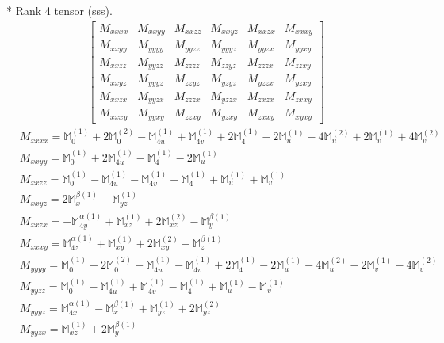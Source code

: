 \documentclass[fleqn,8pt,landscape]{jsarticle}
\begin{document}
* Rank 4 tensor (sss).
\begin{align*}
\begin{bmatrix} M_{xxxx} & M_{xxyy} & M_{xxzz} & M_{xxyz} & M_{xxzx} & M_{xxxy} \\ M_{xxyy} & M_{yyyy} & M_{yyzz} & M_{yyyz} & M_{yyzx} & M_{yyxy} \\ M_{xxzz} & M_{yyzz} & M_{zzzz} & M_{zzyz} & M_{zzzx} & M_{zzxy} \\ M_{xxyz} & M_{yyyz} & M_{zzyz} & M_{yzyz} & M_{yzzx} & M_{yzxy} \\ M_{xxzx} & M_{yyzx} & M_{zzzx} & M_{yzzx} & M_{zxzx} & M_{zxxy} \\ M_{xxxy} & M_{yyxy} & M_{zzxy} & M_{yzxy} & M_{zxxy} & M_{xyxy} \end{bmatrix}
\end{align*}
\begin{align*}
& M_{xxxx} = \mathbb{M}_{0}^{(1)} + 2 \mathbb{M}_{0}^{(2)} - \mathbb{M}_{4u}^{(1)} + \mathbb{M}_{4v}^{(1)} + 2 \mathbb{M}_{4}^{(1)} - 2 \mathbb{M}_{u}^{(1)} - 4 \mathbb{M}_{u}^{(2)} + 2 \mathbb{M}_{v}^{(1)} + 4 \mathbb{M}_{v}^{(2)} \\
& M_{xxyy} = \mathbb{M}_{0}^{(1)} + 2 \mathbb{M}_{4u}^{(1)} - \mathbb{M}_{4}^{(1)} - 2 \mathbb{M}_{u}^{(1)} \\
& M_{xxzz} = \mathbb{M}_{0}^{(1)} - \mathbb{M}_{4u}^{(1)} - \mathbb{M}_{4v}^{(1)} - \mathbb{M}_{4}^{(1)} + \mathbb{M}_{u}^{(1)} + \mathbb{M}_{v}^{(1)} \\
& M_{xxyz} = 2 \mathbb{M}_{x}^{\beta(1)} + \mathbb{M}_{yz}^{(1)} \\
& M_{xxzx} = - \mathbb{M}_{4y}^{\alpha(1)} + \mathbb{M}_{xz}^{(1)} + 2 \mathbb{M}_{xz}^{(2)} - \mathbb{M}_{y}^{\beta(1)} \\
& M_{xxxy} = \mathbb{M}_{4z}^{\alpha(1)} + \mathbb{M}_{xy}^{(1)} + 2 \mathbb{M}_{xy}^{(2)} - \mathbb{M}_{z}^{\beta(1)} \\
& M_{yyyy} = \mathbb{M}_{0}^{(1)} + 2 \mathbb{M}_{0}^{(2)} - \mathbb{M}_{4u}^{(1)} - \mathbb{M}_{4v}^{(1)} + 2 \mathbb{M}_{4}^{(1)} - 2 \mathbb{M}_{u}^{(1)} - 4 \mathbb{M}_{u}^{(2)} - 2 \mathbb{M}_{v}^{(1)} - 4 \mathbb{M}_{v}^{(2)} \\
& M_{yyzz} = \mathbb{M}_{0}^{(1)} - \mathbb{M}_{4u}^{(1)} + \mathbb{M}_{4v}^{(1)} - \mathbb{M}_{4}^{(1)} + \mathbb{M}_{u}^{(1)} - \mathbb{M}_{v}^{(1)} \\
& M_{yyyz} = \mathbb{M}_{4x}^{\alpha(1)} - \mathbb{M}_{x}^{\beta(1)} + \mathbb{M}_{yz}^{(1)} + 2 \mathbb{M}_{yz}^{(2)} \\
& M_{yyzx} = \mathbb{M}_{xz}^{(1)} + 2 \mathbb{M}_{y}^{\beta(1)} \\

\end{align*}
\end{document}
